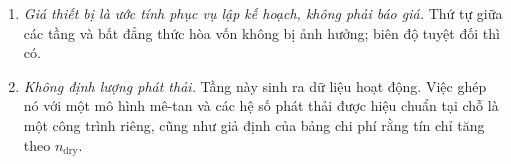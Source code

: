 \begin{enumerate}
$\Theta$ sẽ mất bảo đảm của Mệnh đề~\ref{prop:noalarm} trong bài chính, và đó chính xác là
tình huống mà ngưỡng tỉ lệ cùng phán quyết chờ xác minh tồn tại để hấp thụ.
\item \emph{Giá thiết bị là ước tính phục vụ lập kế hoạch, không phải báo giá.} Thứ tự giữa các
tầng và bất đẳng thức hòa vốn không bị ảnh hưởng; biên độ tuyệt đối thì có.
\item \emph{Không định lượng phát thải.} Tầng này sinh ra dữ liệu hoạt động. Việc ghép nó với
một mô hình mê-tan và các hệ số phát thải được hiệu chuẩn tại chỗ là một công trình riêng,
cũng như giả định của bảng chi phí rằng tín chỉ tăng theo $n_{\mathrm{dry}}$.
\end{enumerate}
